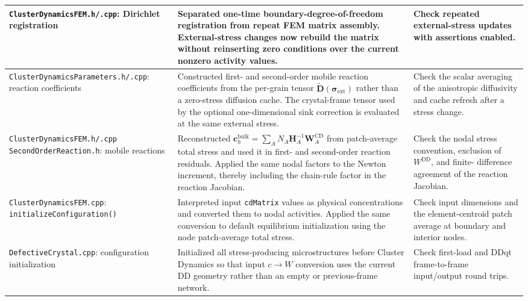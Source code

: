\documentclass[10pt]{article}
\begin{document}
{\begin{longtable}{|>{\raggedright\arraybackslash}p{}|>{\raggedright\arraybackslash}p{}|>{\raggedright\arraybackslash}p{}|}
\texttt{ClusterDynamicsFEM.h/.cpp}: Dirichlet registration
&
Separated one-time boundary-degree-of-freedom registration from repeat FEM
matrix assembly.  External-stress changes now rebuild the matrix without
reinserting zero conditions over the current nonzero activity values.
&
Check repeated external-stress updates with assertions enabled.
\\
\hline

\texttt{ClusterDynamicsParameters.h/.cpp}: reaction coefficients
&
Constructed first- and second-order mobile reaction coefficients from the
per-grain tensor $\widetilde{\bm D}(\bm\sigma_{\mathrm{ext}})$ rather than a
zero-stress diffusion cache.  The crystal-frame tensor used by the optional
one-dimensional sink correction is evaluated at the same external stress.
&
Check the scalar averaging of the anisotropic diffusivity and cache refresh
after a stress change.
\\
\hline

\texttt{ClusterDynamicsFEM.h/.cpp}\newline
\texttt{SecondOrderReaction.h}: mobile reactions
&
Reconstructed $\bm c_h^{\mathrm{bulk}}=\sum_A N_A\bm H_A^{-1}\bm W_A^{\mathrm{CD}}$
from patch-average total stress and used it in first- and second-order reaction
residuals.  Applied the same nodal factors to the Newton increment, thereby
including the chain-rule factor in the reaction Jacobian.
&
Check the nodal stress convention, exclusion of $W^{\mathrm{DD}}$, and finite-
difference agreement of the reaction Jacobian.
\\
\hline

\texttt{ClusterDynamicsFEM.cpp}: \texttt{initializeConfiguration()}
&
Interpreted input \texttt{cdMatrix} values as physical concentrations and
converted them to nodal activities.  Applied the same conversion to default
equilibrium initialization using the node patch-average total stress.
&
Check input dimensions and the element-centroid patch average at boundary and
interior nodes.
\\
\hline

\texttt{DefectiveCrystal.cpp}: configuration initialization
&
Initialized all stress-producing microstructures before Cluster Dynamics so
that input $c\rightarrow W$ conversion uses the current DD geometry rather
than an empty or previous-frame network.
&
Check first-load and DDqt frame-to-frame input/output round trips.
\\
\hline


\end{longtable}}
\end{document}
